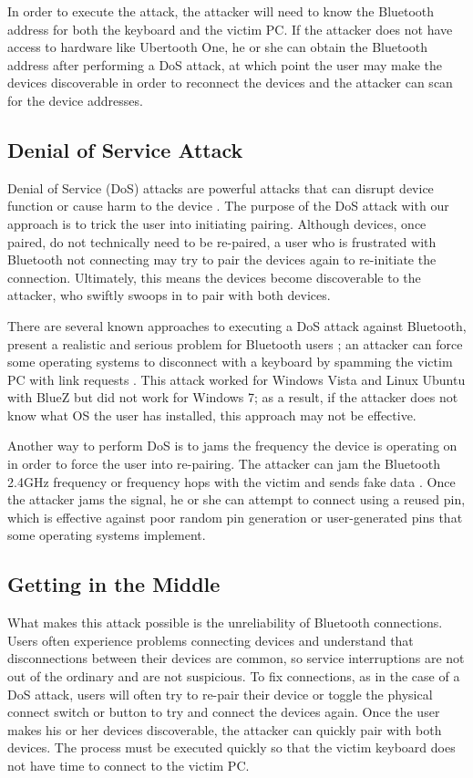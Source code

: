 \documentclass{acm_proc_article-sp}
\begin{document}
In order to execute the attack, the attacker will need to know the Bluetooth address for both the keyboard and the victim PC. If the attacker does not have access to hardware like Ubertooth One, he or she can obtain the Bluetooth address after performing a DoS attack, at which point the user may make the devices discoverable in order to reconnect the devices and the attacker can scan for the device addresses. 

\subsection{Denial of Service Attack}
Denial of Service (DoS) attacks are powerful attacks that can disrupt device function or cause harm to the device \cite{premnath2008battery}. The purpose of the DoS attack with our approach is to trick the user into initiating pairing. Although devices, once paired, do not technically need to be re-paired, a user who is frustrated with Bluetooth not connecting may try to pair the devices again to re-initiate the connection. Ultimately, this means the devices become discoverable to the attacker, who swiftly swoops in to pair with both devices. 

There are several known approaches to executing a DoS attack against Bluetooth, present a realistic and serious problem for Bluetooth users \cite{bandyopadhyay2010information}; an attacker can force some operating systems to disconnect with a keyboard by spamming the victim PC with link requests \cite{cuthbertbluetooth}. This attack worked for Windows Vista and Linux Ubuntu with BlueZ but did not work for Windows 7; as a result, if the attacker does not know what OS the user has installed, this approach may not be effective. 

Another way to perform DoS is to jams the frequency the device is operating on in order to force the user into re-pairing. The attacker can jam the Bluetooth 2.4GHz frequency or frequency hops with the victim and sends fake data \cite{4401672}. Once the attacker jams the signal, he or she can attempt to connect using a reused pin\cite{barnickel2012implementing}, which is effective against poor random pin generation or user-generated pins that some operating systems implement. 

\subsection{Getting in the Middle}
What makes this attack possible is the unreliability of Bluetooth connections. Users often experience problems connecting devices and understand that disconnections between their devices are common, so service interruptions are not out of the ordinary and are not suspicious. To fix connections, as in the case of a DoS attack, users will often try to re-pair their device or toggle the physical connect switch or button to try and connect the devices again. Once the user makes his or her devices discoverable, the attacker can quickly pair with both devices. The process must be executed quickly so that the victim keyboard does not have time to connect to the victim PC. 
\end{document}
